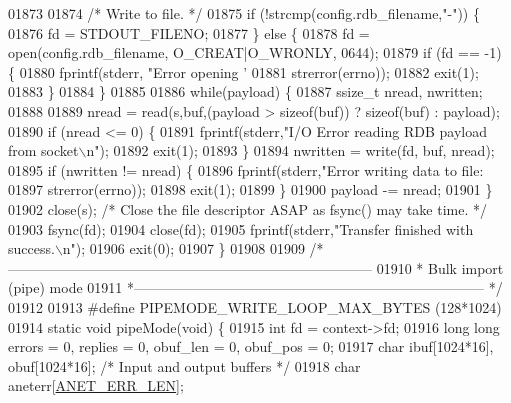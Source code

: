 \begin{DoxyCode}
{{{{{{{{{{{{{{{{{{{{{{{{{{{{{{{{{{{{{{{{{{{{{{{{{{01873 
01874     \textcolor{comment}{/* Write to file. */}
01875     \textcolor{keywordflow}{if} (!strcmp(config.rdb\_filename,\textcolor{stringliteral}{"-"})) \{
01876         fd = STDOUT\_FILENO;
01877     \} \textcolor{keywordflow}{else} \{
01878         fd = open(config.rdb\_filename, O\_CREAT|O\_WRONLY, 0644);
01879         \textcolor{keywordflow}{if} (fd == -1) \{
01880             fprintf(stderr, \textcolor{stringliteral}{"Error opening '%
01881                 strerror(errno));
01882             exit(1);
01883         \}
01884     \}
01885 
01886     \textcolor{keywordflow}{while}(payload) \{
01887         ssize\_t nread, nwritten;
01888 
01889         nread = read(s,buf,(payload > \textcolor{keyword}{sizeof}(buf)) ? \textcolor{keyword}{sizeof}(buf) : payload);
01890         \textcolor{keywordflow}{if} (nread <= 0) \{
01891             fprintf(stderr,\textcolor{stringliteral}{"I/O Error reading RDB payload from socket\(\backslash\)n"});
01892             exit(1);
01893         \}
01894         nwritten = write(fd, buf, nread);
01895         \textcolor{keywordflow}{if} (nwritten != nread) \{
01896             fprintf(stderr,\textcolor{stringliteral}{"Error writing data to file: %
01897                 strerror(errno));
01898             exit(1);
01899         \}
01900         payload -= nread;
01901     \}
01902     close(s); \textcolor{comment}{/* Close the file descriptor ASAP as fsync() may take time. */}
01903     fsync(fd);
01904     close(fd);
01905     fprintf(stderr,\textcolor{stringliteral}{"Transfer finished with success.\(\backslash\)n"});
01906     exit(0);
01907 \}
01908 
01909 \textcolor{comment}{/*------------------------------------------------------------------------------}
01910 \textcolor{comment}{ * Bulk import (pipe) mode}
01911 \textcolor{comment}{ *--------------------------------------------------------------------------- */}
01912 
01913 \textcolor{preprocessor}{#}\textcolor{preprocessor}{define} \textcolor{preprocessor}{PIPEMODE\_WRITE\_LOOP\_MAX\_BYTES} \textcolor{preprocessor}{(}128\textcolor{preprocessor}{*}1024\textcolor{preprocessor}{)}
01914 \textcolor{keyword}{static} \textcolor{keywordtype}{void} pipeMode(\textcolor{keywordtype}{void}) \{
01915     \textcolor{keywordtype}{int} fd = context->fd;
01916     \textcolor{keywordtype}{long} \textcolor{keywordtype}{long} errors = 0, replies = 0, obuf\_len = 0, obuf\_pos = 0;
01917     \textcolor{keywordtype}{char} ibuf[1024*16], obuf[1024*16]; \textcolor{comment}{/* Input and output buffers */}
01918     \textcolor{keywordtype}{char} aneterr[\hyperlink{anet_8h_a92d565f421c133e9fac9dbbe8c88922b}{ANET\_ERR\_LEN}];
}}}}}}}}}}}}}}}}}}}}}}}}}}}}}}}}}}}}}}}}}}}}}}}}}}}}
\end{DoxyCode}
